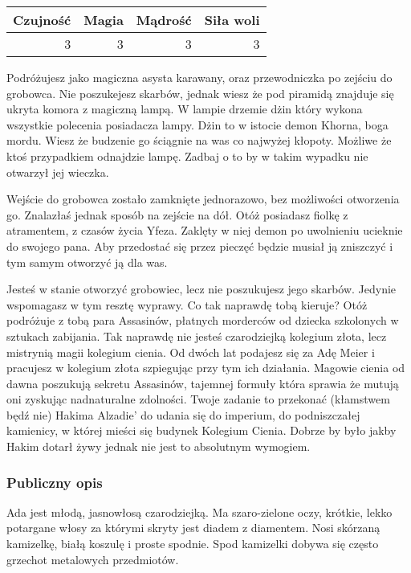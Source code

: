 \documentclass[11pt]{article}
\begin{document}
\begin{center}
\begin{tabular}{rrrr}
 Czujność  &  Magia  &  Mądrość  &  Siła woli  \\
\hline
        3  &      3  &        3  &          3  \\
\end{tabular}
\end{center}


    Podróżujesz jako magiczna asysta karawany, oraz przewodniczka po
    zejściu do grobowca. Nie poszukejesz skarbów, jednak wiesz że pod
    piramidą znajduje się ukryta komora z magiczną lampą. W lampie
    drzemie dżin który wykona wszystkie polecenia posiadacza
    lampy. Dżin to w istocie demon Khorna, boga mordu. Wiesz że
    budzenie go ściągnie na was co najwyżej kłopoty. Możliwe że ktoś
    przypadkiem odnajdzie lampę. Zadbaj o to by w takim wypadku nie
    otwarzył jej wieczka.

    Wejście do grobowca zostało zamknięte jednorazowo, bez możliwości
    otworzenia go. Znalazłaś jednak sposób na zejście na dół. Otóż
    posiadasz fiolkę z atramentem, z czasów życia Yfeza. Zaklęty w
    niej demon po uwolnieniu ucieknie do swojego pana. Aby przedostać
    się przez pieczęć będzie musiał ją zniszczyć i tym samym otworzyć
    ją dla was.

    Jesteś w stanie otworzyć grobowiec, lecz nie poszukujesz jego
    skarbów. Jedynie wspomagasz w tym resztę wyprawy. Co tak naprawdę
    tobą kieruje? Otóż podróżuje z tobą para Assasinów, płatnych
    morderców od dziecka szkolonych w sztukach zabijania. Tak
    naprawdę nie jesteś czarodziejką kolegium złota, lecz mistrynią
    magii kolegium cienia. Od dwóch lat podajesz się za Adę Meier i
    pracujesz w kolegium złota szpiegując przy tym ich
    działania. Magowie cienia od dawna poszukują sekretu Assasinów,
    tajemnej formuły która sprawia że mutują oni zyskując
    nadnaturalne zdolności. Twoje zadanie to przekonać (kłamstwem
    będź nie) Hakima Alzadie' do udania się do imperium, do
    podniszczałej kamienicy, w której mieści się budynek Kolegium
    Cienia. Dobrze by było jakby Hakim dotarł żywy jednak nie jest to
    absolutnym wymogiem.
\subsubsection*{Publiczny opis}
\label{sec-3.3.2}

    Ada jest młodą, jasnowłosą czarodziejką. Ma szaro-zielone oczy,
    krótkie, lekko potargane włosy za którymi skryty jest diadem z
    diamentem. Nosi skórzaną kamizelkę, białą koszulę i proste
    spodnie. Spod kamizelki dobywa się często grzechot metalowych
    przedmiotów.
    
\end{document}
